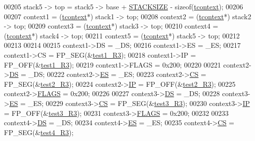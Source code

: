 \begin{DoxyCode}
00205         stack5 -> top = stack5 -> base + \hyperlink{mpx__r2_8h_a21d9543c516fffee84a7963224271f95}{STACKSIZE} - \textcolor{keyword}{sizeof}(\hyperlink{structcontext}{tcontext}); 
00206         
00207         context1 = (\hyperlink{structcontext}{tcontext}*) stack1 -> top;
00208         context2 = (\hyperlink{structcontext}{tcontext}*) stack2 -> top;
00209         context3 = (\hyperlink{structcontext}{tcontext}*) stack3 -> top;
00210         context4 = (\hyperlink{structcontext}{tcontext}*) stack4 -> top;
00211         context5 = (\hyperlink{structcontext}{tcontext}*) stack5 -> top;
00212         
00213         
00214         
00215         context1->DS = \_DS;
00216         context1->ES = \_ES;
00217         context1->CS = FP\_SEG(&\hyperlink{procs-r3_8c_ae4496e9c01adc7562ce34516c13226a0}{test1_R3});
00218         context1->IP = FP\_OFF(&\hyperlink{procs-r3_8c_ae4496e9c01adc7562ce34516c13226a0}{test1_R3});
00219         context1->FLAGS = 0x200;
00220         
00221         context2->\hyperlink{structcontext_a657e73663a4443be61a078d31c28ee3e}{DS} = \_DS;
00222         context2->\hyperlink{structcontext_a81a78fef7bda3a5dd852b28a905890ab}{ES} = \_ES;
00223         context2->\hyperlink{structcontext_a0b41903d1fa3b4e1ce892f59480323b5}{CS} = FP\_SEG(&\hyperlink{procs-r3_8c_ab61a49e4507b3dba1bfad0cc9510d0a6}{test2_R3});
00224         context2->\hyperlink{structcontext_a02ac427e75af0dfe7d649dc8821cde0a}{IP} = FP\_OFF(&\hyperlink{procs-r3_8c_ab61a49e4507b3dba1bfad0cc9510d0a6}{test2_R3});
00225         context2->\hyperlink{structcontext_a251dc5ae40a989bef945d2df6925f9a3}{FLAGS} = 0x200;
00226         
00227         context3->\hyperlink{structcontext_a657e73663a4443be61a078d31c28ee3e}{DS} = \_DS;
00228         context3->\hyperlink{structcontext_a81a78fef7bda3a5dd852b28a905890ab}{ES} = \_ES;
00229         context3->\hyperlink{structcontext_a0b41903d1fa3b4e1ce892f59480323b5}{CS} = FP\_SEG(&\hyperlink{procs-r3_8c_a453a58ecc6482a24bf02e7caf67aa41a}{test3_R3});
00230         context3->\hyperlink{structcontext_a02ac427e75af0dfe7d649dc8821cde0a}{IP} = FP\_OFF(&\hyperlink{procs-r3_8c_a453a58ecc6482a24bf02e7caf67aa41a}{test3_R3});
00231         context3->\hyperlink{structcontext_a251dc5ae40a989bef945d2df6925f9a3}{FLAGS} = 0x200;
00232         
00233         context4->\hyperlink{structcontext_a657e73663a4443be61a078d31c28ee3e}{DS} = \_DS;
00234         context4->\hyperlink{structcontext_a81a78fef7bda3a5dd852b28a905890ab}{ES} = \_ES;
00235         context4->\hyperlink{structcontext_a0b41903d1fa3b4e1ce892f59480323b5}{CS} = FP\_SEG(&\hyperlink{procs-r3_8c_aaa737ca092fa5d35b33665401852fb7b}{test4_R3});

\end{DoxyCode}
